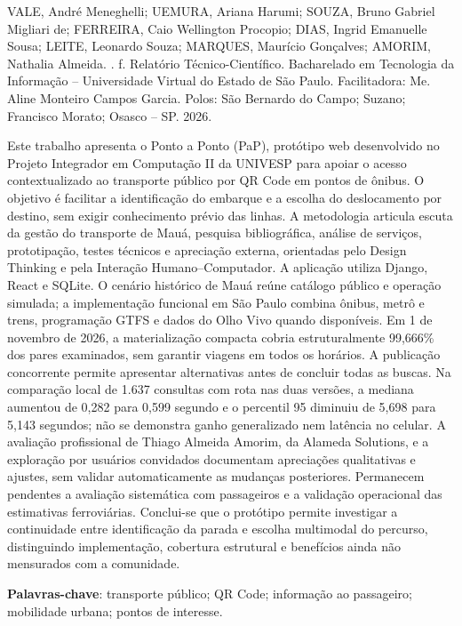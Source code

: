 \documentclass[12pt,oneside,a4paper,brazil,chapter=TITLE]{abntex2}
\begin{document}
\begin{resumo}
\SingleSpacing
\noindent VALE, André Meneghelli; UEMURA, Ariana Harumi; SOUZA, Bruno Gabriel Migliari de; FERREIRA, Caio Wellington Procopio; DIAS, Ingrid Emanuelle Sousa; LEITE, Leonardo Souza; MARQUES, Maurício Gonçalves; AMORIM, Nathalia Almeida. \textit{\imprimirtitulo}. \ztotpages{} f. Relatório Técnico-Científico. Bacharelado em Tecnologia da Informação -- Universidade Virtual do Estado de São Paulo. Facilitadora: Me. Aline Monteiro Campos Garcia. Polos: São Bernardo do Campo; Suzano; Francisco Morato; Osasco -- SP. 2026.
\par\medskip
Este trabalho apresenta o Ponto a Ponto (PaP), protótipo web desenvolvido no Projeto Integrador em Computação II da UNIVESP para apoiar o acesso contextualizado ao transporte público por QR Code em pontos de ônibus. O objetivo é facilitar a identificação do embarque e a escolha do deslocamento por destino, sem exigir conhecimento prévio das linhas. A metodologia articula escuta da gestão do transporte de Mauá, pesquisa bibliográfica, análise de serviços, prototipação, testes técnicos e apreciação externa, orientadas pelo Design Thinking e pela Interação Humano--Computador. A aplicação utiliza Django, React e SQLite. O cenário histórico de Mauá reúne catálogo público e operação simulada; a implementação funcional em São Paulo combina ônibus, metrô e trens, programação GTFS e dados do Olho Vivo quando disponíveis. Em 1 de novembro de 2026, a materialização compacta cobria estruturalmente 99,666\% dos pares examinados, sem garantir viagens em todos os horários. A publicação concorrente permite apresentar alternativas antes de concluir todas as buscas. Na comparação local de 1.637 consultas com rota nas duas versões, a mediana aumentou de 0,282 para 0,599 segundo e o percentil 95 diminuiu de 5,698 para 5,143 segundos; não se demonstra ganho generalizado nem latência no celular. A avaliação profissional de Thiago Almeida Amorim, da Alameda Solutions, e a exploração por usuários convidados documentam apreciações qualitativas e ajustes, sem validar automaticamente as mudanças posteriores. Permanecem pendentes a avaliação sistemática com passageiros e a validação operacional das estimativas ferroviárias. Conclui-se que o protótipo permite investigar a continuidade entre identificação da parada e escolha multimodal do percurso, distinguindo implementação, cobertura estrutural e benefícios ainda não mensurados com a comunidade.

\par\vfill
\noindent\textbf{Palavras-chave}: transporte público; QR Code; informação ao passageiro; mobilidade urbana; pontos de interesse.
\end{resumo}
\begingroup
\SingleSpacing
\setlength{\beforechapskip}{0pt}
\setlength{\afterchapskip}{6pt}
\setlength{\cftbeforechapterskip}{2pt}
\setpnumwidth{2em}
\setrmarg{3em}
\setlength{\cftbeforesubsectionskip}{-1.8pt}
\tableofcontents*
\endgroup
\cleardoublepage
\end{document}
